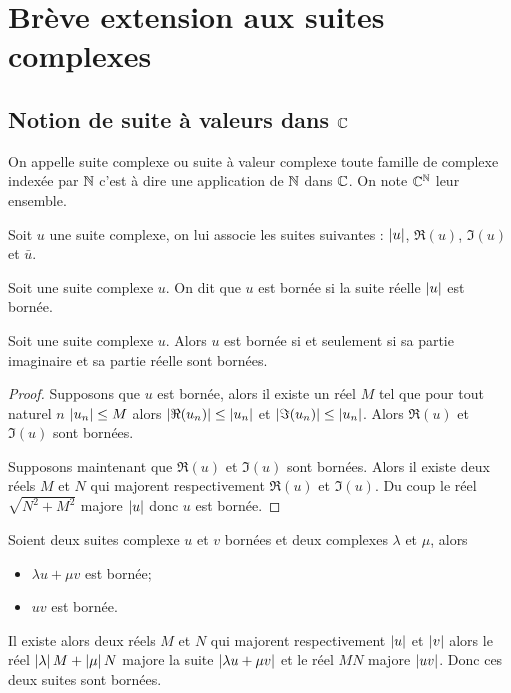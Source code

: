 \section{Brève extension aux suites complexes}

\subsection{Notion de suite à valeurs dans $\mathbb{C}$}

\begin{defdef}
  On appelle suite complexe ou suite à valeur complexe toute famille de complexe indexée par $\mathbb{N}$ c'est à dire une application de $\mathbb{N}$ dans $\mathbb{C}$. On note $\mathbb{C}^{\mathbb{N}}$ leur ensemble.
\end{defdef}
\begin{defdef}
  Soit $u$ une suite complexe, on lui associe les suites suivantes : $\left\lvert u\right\rvert$, $\Re(u)$, $\Im(u)$ et $\bar{u}$.
\end{defdef}
\begin{defdef}
  Soit une suite complexe $u$. On dit que $u$ est bornée si la suite réelle $\left\lvert u\right\rvert$ est bornée.
\end{defdef}

\begin{prop}
  Soit une suite complexe $u$. Alors $u$ est bornée si et seulement si sa partie imaginaire et sa partie réelle sont bornées.
\end{prop}
\begin{proof}
  Supposons que $u$ est bornée, alors il existe un réel $M$ tel que pour tout naturel $n$ $\left\lvert u_n\right\rvert \leq M$ alors $\left\lvert\Re(u_n)\right\rvert \leq \left\lvert u_n\right\rvert$ et $\left\lvert\Im(u_n)\right\rvert \leq \left\lvert u_n\right\rvert$. Alors $\Re(u)$ et $\Im(u)$ sont bornées.

Supposons maintenant que $\Re(u)$ et $\Im(u)$ sont bornées. Alors il existe deux réels $M$ et $N$ qui majorent respectivement $\Re(u)$ et $\Im(u)$. Du coup le réel $\sqrt{N^2+M^2}$ majore $\left\lvert u\right\rvert$ donc $u$ est bornée.
\end{proof}

\begin{prop}
  Soient deux suites complexe $u$ et $v$ bornées et deux complexes $\lambda$ et $\mu$, alors
  \begin{itemize}
  \item $\lambda u + \mu v$ est bornée;
  \item $uv$ est bornée.
  \end{itemize}
Il existe alors deux réels $M$ et $N$ qui majorent respectivement $\left\lvert u\right\rvert$ et $\left\lvert v\right\rvert$ alors le réel $\left\lvert\lambda\right\rvert M+\left\lvert\mu\right\rvert N$ majore la suite $\left\lvert\lambda u + \mu v\right\rvert$ et le réel $MN$ majore $\left\lvert uv\right\rvert$. Donc ces deux suites sont bornées.
\end{prop}

